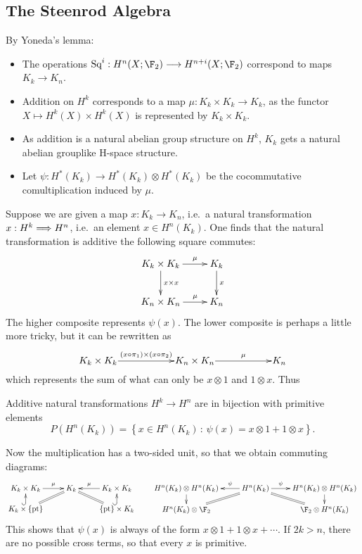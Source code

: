 \documentclass[11pt]{article}
\begin{document}
\subsection{The Steenrod Algebra}
By Yoneda's lemma:
\begin{itemize}\squishlist
\item The operations $\Squ^i:{H}^{n}(X;\F_2)\to{H}^{n+i}(X;\F_2)$ correspond to maps $K_k\to K_n$.
\item Addition on $H^k$ corresponds to a map $\mu:K_k\times K_k\to K_k$, as the functor $X\mapsto H^k(X)\times H^k(X)$ is represented by $K_k\times K_k$.
\item As addition is a natural abelian group structure on $H^k$, $K_k$ gets a natural abelian grouplike H-space structure.
\item Let $\psi:H^*(K_k)\to H^*(K_k)\otimes H^*(K_k)$ be the cocommutative comultiplication induced by $\mu$.
\end{itemize}
Suppose we are given a map $x:K_k\to K_n$, i.e.\ a natural transformation $x:H^k\Longrightarrow H^n$, i.e.\ an element $x\in H^n(K_k)$. One finds that the natural transformation is additive \Iff the following square commutes:
\[\xymatrix{
K_k\times K_k
\ar[r]^-{\mu}
\ar[d]^-{x\times x}
&%
K_k
\ar[d]^-{x}
\\%
K_n\times K_n
\ar[r]^-{\mu}
&%
K_n%
}\]
The higher composite represents $\psi(x)$. The lower composite is perhaps a little more tricky, but it can be rewritten as
\[\vcenter{\xymatrix@1@C=2cm{
K_k\times K_k
\ar[r]^-{(x\circ\pi_1)\times (x\circ\pi_2)}
&%
K_n\times K_n
\ar[r]^-{\mu}
&%
K_n%
}}\]
which represents the sum of what can only be $x\otimes 1$ and $1\otimes x$. Thus
\begin{prop*}
Additive natural transformations $H^k\to H^n$ are in bijection with primitive elements
\[P(H^n(K_k))=\left\{x\in H^n(K_k)\,:\,\psi(x)=x\otimes 1+1\otimes x\right\}.\]
\end{prop*}
\noindent Now the multiplication has a two-sided unit, so that we obtain commuting diagrams:
\[\xymatrix@R=.4cm{
K_k\times K_k
\ar[r]^-{\mu}
&%
K_k
\ar@{=}[rd]
\ar@{=}[ld]
&%
K_k\times K_k
\ar[l]_-{\mu}
\\%
K_k\times\{\textup{pt}\}\ar@{^{(}->}[u]
&%
&%
\{\textup{pt}\}\times K_k\ar@{^{(}->}[u]
}\qquad 
\xymatrix@R=.4cm{
H^n(K_k)\otimes H^n(K_k)
\ar[r];[]_-{\psi}
&%
H^n(K_k)
\ar@{=}[dr];[]\ar@{=}[dl];[]
&%
H^n(K_k)\otimes H^n(K_k)
\ar[l];[]^-{\psi}
\\%
H^n(K_k)\otimes\F_2\ar[u];[]
&%
&%
\F_2\otimes H^n(K_k)\ar[u];[]
}\]
This shows that $\psi(x)$ is always of the form $x\otimes 1+1\otimes x+\cdots$. If $2k>n$, there are no possible cross terms, so that every $x$ is primitive.
\end{document}
